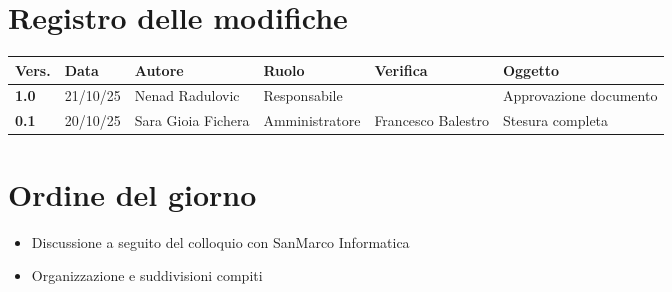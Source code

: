 \documentclass[a4paper,12pt]{article}
\begin{document}


\newpage
\section*{Registro delle modifiche}

\begin{table}[h!]
\begin{tabularx}{\textwidth}{|l|l|l|l|L|L|}
\hline
\textbf{Vers.} & \textbf{Data} & \textbf{Autore} & \textbf{Ruolo} & \textbf{Verifica} & \textbf{Oggetto} \\
\hline
\textbf{1.0} & 21/10/25 & Nenad Radulovic & Responsabile &  & Approvazione documento \\
\textbf{0.1} & 20/10/25 & Sara Gioia Fichera & Amministratore & Francesco Balestro & Stesura completa \\
\hline
\end{tabularx}
\end{table}

\newpage
\tableofcontents
\newpage

\markright{}

\newpage
\section{Ordine del giorno}

\begin{itemize}
    \item Discussione a seguito del colloquio con SanMarco Informatica
    \item Organizzazione e suddivisioni compiti
\end{itemize}
\newpage
\end{document}
